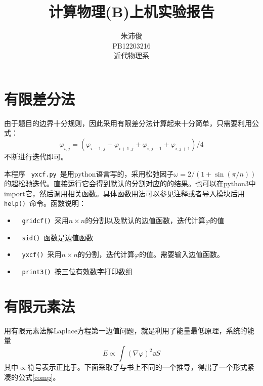 \documentclass{article}
\newcommand{\comm}[1]{\ {\color{blue} \texttt{#1}}\ }
\begin{document}
\title{计算物理(B)上机实验报告}
\author{朱沛俊\\ PB12203216\\近代物理系}
\maketitle
\section{有限差分法}
由于题目的边界十分规则，因此采用有限差分法计算起来十分简单，只需要利用公式：
\[\varphi_{i,j}=(\varphi_{i-1,j}+\varphi_{i+1,j}+\varphi_{i,j-1}+\varphi_{i,j+1})/4\]
不断进行迭代即可。

本程序\comm{yxcf.py}是用python语言写的，采用松弛因子$\omega=2/(1+\sin(\pi/n))$的超松驰迭代。直接运行它会得到默认的分割对应的的结果。也可以在python3中import它，然后调用相关函数。具体函数用法可以参见注释或者导入模块后用\comm{help()}命令。函数说明：
\begin{itemize}
 \item \comm{gridcf()}采用$n\times n$的分割以及默认的边值函数，迭代计算$\varphi$的值
 \item \comm{sid()}函数是边值函数
 \item \comm{yxcf()}采用$n\times n$的分割，迭代计算$\varphi$的值。需要输入边值函数。
 \item \comm{print3()}按三位有效数字打印数组
\end{itemize}
\section{有限元素法}
用有限元素法解Laplace方程第一边值问题，就是利用了能量最低原理，系统的能量
\[E\propto \int(\nabla\varphi)^2\dd S\]
其中$\propto$符号表示正比于。下面采取了与书上不同的一个推导，得出了一个形式紧凑的公式\ref{comp}。
\end{document}
